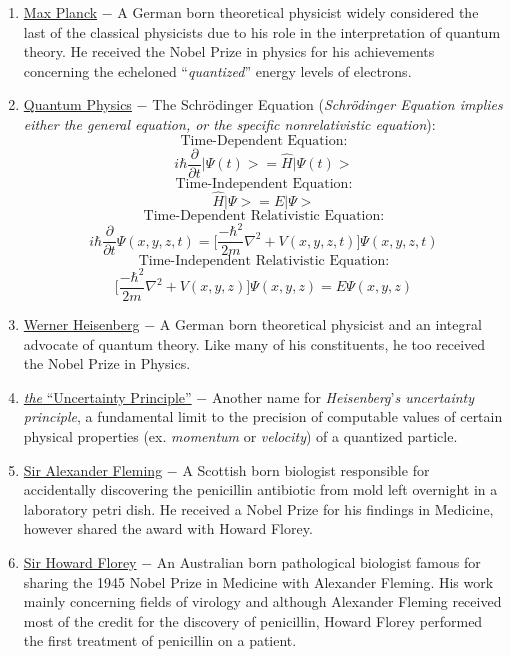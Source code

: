 \documentclass[12pt]{article}
\begin{document}
\begin{flushleft}
\begin{enumerate}
\item \underline{Max Planck} $-$ A German born theoretical physicist widely considered the last of the classical physicists due to his role in the interpretation of quantum theory. He received the Nobel Prize in physics for his achievements concerning the echeloned ``\emph{quantized}'' energy levels of electrons. 

\item \underline{Quantum Physics} $-$ The Schr\"odinger Equation (\emph{Schr\"odinger Equation implies either the general equation, or the specific nonrelativistic equation}):
$$ \text{Time-Dependent Equation:} $$
$$ i\hbar\frac{\partial}{\partial t}\bigl| \Psi(t)\bigr>=\hat{H}\bigr|\Psi(t)\bigr>$$
$$ \text{Time-Independent Equation:} $$
$$ \hat{H}\bigr|\Psi\bigr>=E\bigr|\Psi\bigr>$$
$$ \text{Time-Dependent Relativistic Equation:} $$
$$ i\hbar\frac{\partial}{\partial t}\Psi(x,y,z,t) = \biggl[ \frac{-\hbar^2}{2m}\nabla^2 +V(x,y,z,t)\biggr]\Psi(x,y,z,t)$$
$$ \text{Time-Independent Relativistic Equation:} $$
$$ \biggl[ \frac{-\hbar^2}{2m}\nabla^2 +V(x,y,z)\biggr]\Psi(x,y,z) = E\Psi(x,y,z) $$

\item \underline{Werner Heisenberg} $-$ A German born theoretical physicist and an integral advocate of quantum theory. Like many of his constituents, he too received the Nobel Prize in Physics.

\item \underline{\emph{the} ``Uncertainty Principle''} $-$ Another name for \emph{Heisenberg}'\emph{s uncertainty principle}, a fundamental limit to the precision of computable values of certain physical properties (ex. \emph{momentum} or \emph{velocity}) of a quantized particle.

\item \underline{Sir Alexander Fleming} $-$ A Scottish born biologist responsible for accidentally discovering the penicillin antibiotic from mold left overnight in a laboratory petri dish. He received a Nobel Prize for his findings in Medicine, however shared the award with Howard Florey. 

\item \underline{Sir Howard Florey} $-$ An Australian born pathological biologist famous for sharing the 1945 Nobel Prize in Medicine with Alexander Fleming. His work mainly concerning fields of virology and although Alexander Fleming received most of the credit for the discovery of penicillin, Howard Florey performed the first treatment of penicillin on a patient.


\end{enumerate}
\end{flushleft}
\end{document}
